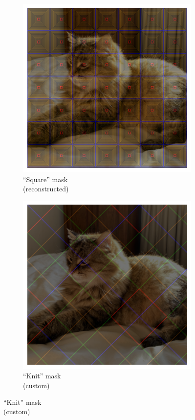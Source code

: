 \documentclass[a4paper, oneside]{discothesis}
\begin{document}
\begin{figure}[th]
	\hfill
	\begin{subfigure}[t]{0.19\textwidth}\centering\includegraphics[width=\linewidth]{figures/hcaptcha-copy-square.png}\caption{``Square'' mask\\(reconstructed)}\label{fig:subfig7}\end{subfigure}
	\hfill
	\begin{subfigure}[t]{0.19\textwidth}\centering\includegraphics[width=\linewidth]{figures/hcaptcha-copy-knit.png}\caption{``Knit'' mask\\(custom)}\label{fig:subfig8}\end{subfigure}

\end{figure}
\end{document}
